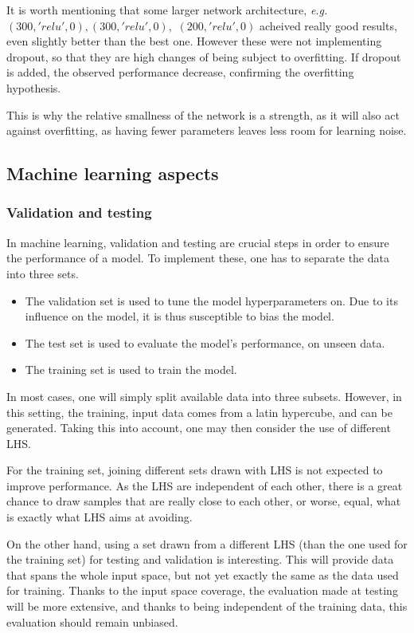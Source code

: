 It is worth mentioning that some larger network architecture, \textit{e.g.} $(300, 'relu', 0), (300, 'relu', 0),$ $(200, 'relu', 0)$ acheived really good results, even slightly better than the best one. However these were not implementing dropout, so that they are high changes of being subject to overfitting. If dropout is added, the observed performance decrease, confirming the overfitting hypothesis.

This is why the relative smallness of the network is a strength, as it will also act against overfitting, as having fewer parameters leaves less room for learning noise.

\subsection{Machine learning aspects}

\subsubsection{Validation and testing\label{ssec:val-testing}}

In machine learning, validation and testing are crucial steps in order to ensure the performance of a model. To implement these, one has to separate the data into three sets.

\begin{itemize}
    \item The validation set is used to tune the model hyperparameters on. Due to its influence on the model, it is thus susceptible to bias the model.
    \item The test set is used to evaluate the model's performance, on unseen data.
    \item The training set is used to train the model.
\end{itemize}

In most cases, one will simply split available data into three subsets. However, in this setting, the training, input data comes from a latin hypercube, and can be generated. Taking this into account, one may then consider the use of different LHS.

For the training set, joining different sets drawn with LHS is not expected to improve performance. As the LHS are independent of each other, there is a great chance to draw samples that are really close to each other, or worse, equal, what is exactly what LHS aims at avoiding.

On the other hand, using a set drawn from a different LHS (than the one used for the training set) for testing and validation is interesting. This will provide data that spans the whole input space, but not yet exactly the same as the data used for training. Thanks to the input space coverage, the evaluation made at testing will be more extensive, and thanks to being independent of the training data, this evaluation should remain unbiased. 

